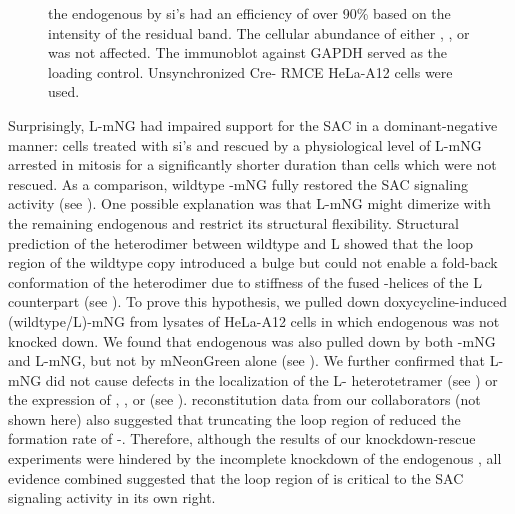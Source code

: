 \begin{figure}
the endogenous  by si's had an efficiency of over 90\% based on the intensity of the residual  band. The cellular abundance of either , , or  was not affected. The immunoblot against GAPDH served as the loading control. Unsynchronized Cre- RMCE HeLa-A12 cells were used.
\end{figure}

Surprisingly, \textDelta{}L-mNG had impaired support for the SAC in a dominant-negative manner: cells treated with si's and rescued by a physiological level of \textDelta{}L-mNG arrested in mitosis for a significantly shorter duration than cells which were not rescued. As a comparison, wildtype -mNG fully restored the SAC signaling activity (see ). One possible explanation was that \textDelta{}L-mNG might dimerize with the remaining endogenous  and restrict its structural flexibility. Structural prediction of the heterodimer between wildtype  and \textDelta{}L showed that the loop region of the wildtype copy introduced a bulge but could not enable a fold-back conformation of the heterodimer due to stiffness of the fused \textalpha{}-helices of the \textDelta{}L counterpart (see ). To prove this hypothesis, we pulled down doxycycline-induced (wildtype/\textDelta{}L)-mNG from lysates of HeLa-A12 cells in which endogenous  was not knocked down. We found that endogenous  was also pulled down by both -mNG and \textDelta{}L-mNG, but not by mNeonGreen alone (see ). We further confirmed that \textDelta{}L-mNG did not cause defects in the localization of the \textDelta{}L- heterotetramer (see ) or the expression of , , or  (see ).  reconstitution data from our collaborators (not shown here) also suggested that truncating the loop region of  reduced the formation rate of -. Therefore, although the results of our knockdown-rescue experiments were hindered by the incomplete knockdown of the endogenous , all evidence combined suggested that the loop region of  is critical to the SAC signaling activity in its own right.


